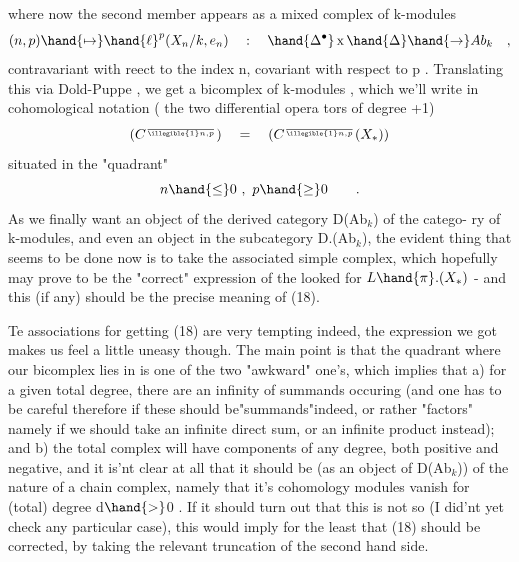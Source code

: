 
where now the second member appears as a mixed complex  of k-modules
\[ (n,p)\hand{\mapsto}\hand{\ell}^{p}(X_{n}/k,e_{n}) \quad : \quad \hand{\Delta^{\bullet}}\,\mathrm{x}\,\hand{\Delta}\hand{\to}Ab_{k} \quad , \]
contravariant with reect to the index n,  covariant with respect to
p .  Translating this via Dold-Puppe ,  we get a bicomplex of k-modules ,
which we'll write in cohomological notation ( the two  differential opera%
tors of degree +1)
\[ (C^{\over{\illegible{1}}{n,p}}) \quad = \quad (C^{\over{\illegible{1}}{n,p}}(X_{*})) \]
situated in the "quadrant"
\[ n \hand{\leq} 0 \ , \ p \hand{\geq} 0 \qquad . \]
As we finally want an object of the derived category D(Ab$_{k}$) of the catego-%
ry of k-modules,  and even an object in the subcategory D.(Ab$_{k}$),  the
evident thing that seems to be done now is to take the associated simple
complex,  which hopefully may prove to be the "correct" expression of the
looked for $L\hand{\pi}.(X_{*})$  -  and this (if any) should be the precise meaning of
(18).

Te associations for getting  (18) are very tempting
indeed,  the expression we got makes us feel a little uneasy though.  The
main point is that the quadrant where our bicomplex lies in is one of the
two "awkward" one's,  which implies that  a) for a given total degree,
there are an infinity of  summands occuring (and one has to be 
careful therefore if these should be"summands"indeed, or rather "factors"
namely if we should take an infinite direct sum, or an infinite product
instead);  and  b)  the total complex will have components of any degree,
both positive and negative,  and it is'nt clear at all that it should be
(as an object of D(Ab$_{k}$)) of the nature of a chain complex,  namely that
it's cohomology modules vanish  for (total) degree d$\hand{>}$0 .   If
it should turn out that this is not so (I did'nt yet check any particular
case),  this would imply for the least that (18) should be corrected,  by
taking the relevant truncation of the second hand side.


